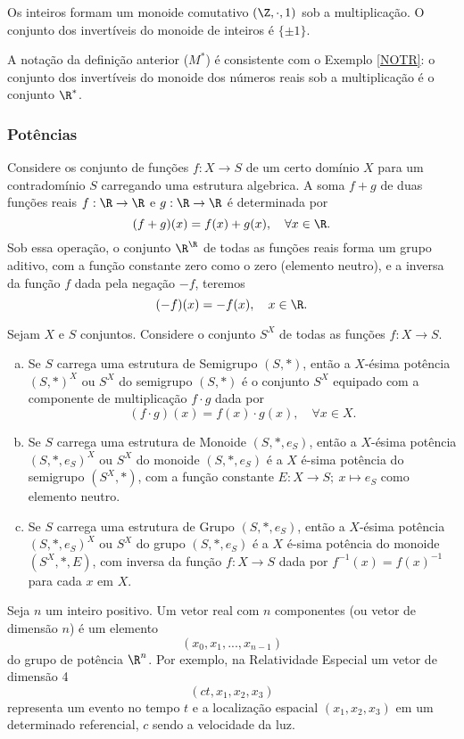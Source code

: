          \begin{exmp}
            Os inteiros formam um monoide comutativo $(\Z,\cdot , 1)$ sob a multiplicação. O conjunto dos invertíveis do monoide de inteiros é $\{\pm 1\}$.
         \end{exmp}
         \begin{exmp}
            A notação da definição anterior ($M^*$) é consistente com o Exemplo \ref{NOTR}: o conjunto dos invertíveis do monoide dos números reais sob a multiplicação é o conjunto $\R^*$.
         \end{exmp}

      \subsubsection{Potências}
         Considere os conjunto de funções $f: X\to S$ de um certo domínio $X$ para um contradomínio $S$ carregando uma estrutura algebrica. A soma $f + g$ de duas funções reais $f: \R \to \R$ e $g: \R \to \R$ é determinada por
         $$(f+g)(x)=f(x)+g(x),\quad \forall x \in \R.$$ Sob essa operação, o conjunto $\R^{\R}$ de todas as funções reais forma um grupo aditivo, com a função constante zero como o zero (elemento neutro), e a inversa da função $f$ dada pela negação $-f$, teremos
         $$(-f)(x) = -f(x), \quad x\in \R.$$

         \begin{definition}
            Sejam $X$ e $S$ conjuntos. Considere o conjunto $S^{X}$ de todas as funções $f: X\to S$.
            \begin{enumerate}[(a)]
               \item Se $S$ carrega uma estrutura de Semigrupo $(S,*)$, então a $X$-ésima potência $(S,*)^{X}$ ou $S^{X}$ do semigrupo $(S,*)$ é o conjunto $S^X$ equipado com a componente de multiplicação $f\cdot g$ dada por $$(f\cdot g)(x)=f(x)\cdot g(x), \quad \forall x \in X.$$
               \item Se $S$ carrega uma estrutura de Monoide $(S,*,e_{S})$, então a $X$-ésima potência $(S,*,e_{S})^{X}$ ou $S^X$ do monoide $(S,*,e_{S})$ é a $X$ é-sima potência do semigrupo $(S^X , *)$, com a função constante $E: X\to S;\ x\mapsto e_{S}$ como elemento neutro.
               \item Se $S$ carrega uma estrutura de Grupo $(S,*,e_{S})$, então a $X$-ésima potência $(S,*,e_{S})^X$ ou $S^X$ do grupo $(S,*,e_{S})$ é a $X$ é-sima potência do monoide $(S^X,*,E)$, com inversa da função $f: X\to S$ dada por $f^{-1}(x)=f(x)^{-1}$ para cada $x$ em $X$.
            \end{enumerate}
         \end{definition}
         \begin{exmp}[Vetores]
            Seja $n$ um inteiro positivo. Um vetor real com $n$ componentes (ou vetor de dimensão $n$) é um elemento
            $$(x_{0},x_{1},...,x_{n-1})$$
            do grupo de potência $\R^n$. Por exemplo, na Relatividade Especial um vetor de dimensão 4
            $$(ct,x_{1},x_{2},x_{3})$$
            representa um evento no tempo $t$ e a localização espacial $(x_{1},x_{2},x_{3})$ em um determinado referencial, $c$ sendo a velocidade da luz.
         \end{exmp}

